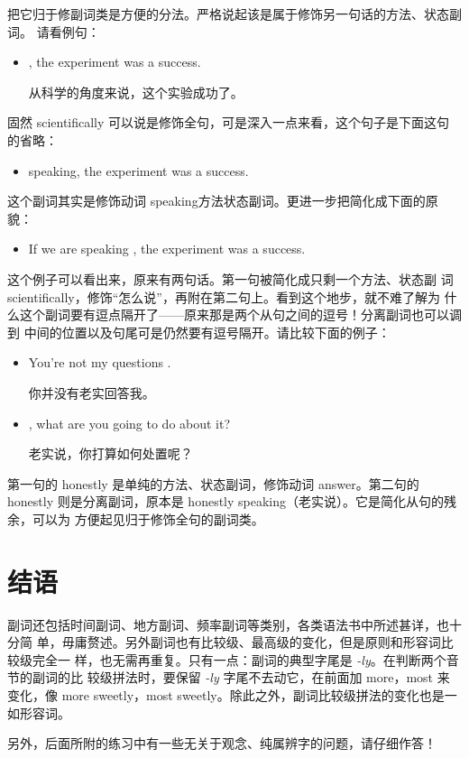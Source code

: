把它归于修副词类是方便的分法。严格说起该是属于修饰另一句话的方法、状态副词。
请看例句：
\begin{itemize}
\item  {}, the experiment was a success.

  从科学的角度来说，这个实验成功了。
\end{itemize}
固然 scientifically 可以说是修饰全句，可是深入一点来看，这个句子是下面这句的省略：
\begin{itemize}
\item  {} speaking, the experiment was a success.
\end{itemize}
这个副词其实是修饰动词 speaking方法状态副词。更进一步把简化成下面的原貌：
\begin{itemize}
\item  If we are speaking , the experiment was a success.
\end{itemize}
这个例子可以看出来，原来有两句话。第一句被简化成只剩一个方法、状态副
词scientifically，修饰“怎么说”，再附在第二句上。看到这个地步，就不难了解为
什么这个副词要有逗点隔开了——原来那是两个从句之间的逗号！分离副词也可以调到
中间的位置以及句尾可是仍然要有逗号隔开。请比较下面的例子：
\begin{itemize}
\item  You're not  my questions .

  你并没有老实回答我。
\item  {}, what are you going to do about it?

  老实说，你打算如何处置呢？
\end{itemize}
第一句的 honestly 是单纯的方法、状态副词，修饰动词 answer。第二句的honestly
则是分离副词，原本是 honestly speaking（老实说）。它是简化从句的残余，可以为
方便起见归于修饰全句的副词类。

\section{结语}

副词还包括时间副词、地方副词、频率副词等类别，各类语法书中所述甚详，也十分简
单，毋庸赘述。另外副词也有比较级、最高级的变化，但是原则和形容词比较级完全一
样，也无需再重复。只有一点：副词的典型字尾是 \emph{-ly}。在判断两个音节的副词的比
较级拼法时，要保留 \emph{-ly} 字尾不去动它，在前面加 more，most 来变化，像 more
sweetly，most sweetly。除此之外，副词比较级拼法的变化也是一如形容词。

另外，后面所附的练习中有一些无关于观念、纯属辨字的问题，请仔细作答！

